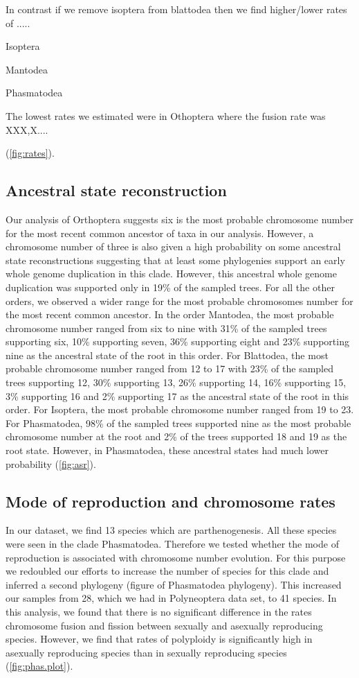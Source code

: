 In contrast if we remove isoptera from blattodea then we find higher/lower rates of .....

Isoptera

Mantodea

Phasmatodea

The lowest rates we estimated were in Othoptera where the fusion rate was XXX,X....



(\cref{fig:rates}). 



\subsection{Ancestral state reconstruction}
Our analysis of Orthoptera suggests six is the most probable chromosome number for the most recent common ancestor of taxa in our analysis. 
However, a chromosome number of three is also given a high probability on some ancestral state reconstructions suggesting that at least some phylogenies support an early whole genome duplication in this clade.
However, this ancestral whole genome duplication was supported only in 19\% of the sampled trees.
For all the other orders, we observed a wider range for the most probable chromosomes number for the most recent common ancestor.
In the order Mantodea, the most probable chromosome number ranged from six to nine with 31\% of the sampled trees supporting six, 10\% supporting seven, 36\% supporting eight and 23\% supporting nine as the ancestral state of the root in this order. 
For Blattodea, the most probable chromosome number ranged from 12 to 17 with 23\% of the sampled trees supporting 12, 30\% supporting 13, 26\% supporting 14, 16\% supporting 15, 3\% supporting 16 and 2\% supporting 17 as the ancestral state of the root in this order.
For Isoptera, the most probable chromosome number ranged from 19 to 23.
For Phasmatodea, 98\% of the sampled trees supported nine as the most probable chromosome number at the root and 2\% of the trees supported 18 and 19 as the root state. 
However, in Phasmatodea, these ancestral states had much lower probability (\cref{fig:asr}).

\subsection{Mode of reproduction and chromosome rates}
In our dataset, we find 13 species which are parthenogenesis. 
All these species were seen in the clade Phasmatodea.
Therefore we tested whether the mode of reproduction is associated with chromosome number evolution. 
For this purpose we redoubled our efforts to increase the number of species for this clade and inferred a second phylogeny (figure of Phasmatodea phylogeny).
This increased our samples from 28, which we had in Polyneoptera data set, to 41 species. 
In this analysis, we found that there is no significant difference in the rates chromosome fusion and fission between sexually and asexually reproducing species.
However, we find that rates of polyploidy is significantly high in asexually reproducing species than in sexually reproducing species (\cref{fig:phas.plot}).